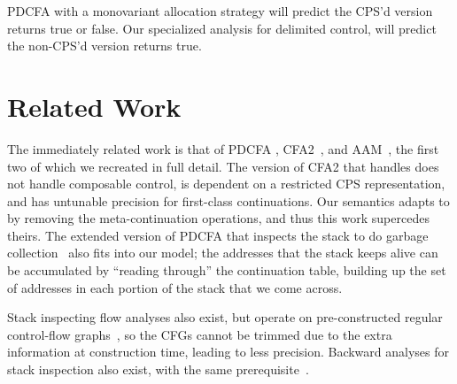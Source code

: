 {\begin{SCodeFlow}
\begin{RktBlk}
\begin{SingleColumn}
\mbox{}\RktPn{(}\mbox{}\mbox{}\RktPn{(}\RktSym{$\lambda$}\mbox{}\RktPn{(}\RktPn{)}\mbox{}\RktPn{(}\mbox{}\mbox{}\RktPn{(}\RktSym{$\lambda$}\mbox{}\RktPn{(}\RktPn{)}\mbox{}\RktPn{(}\RktSym{$\le$}\mbox{}\mbox{}\RktPn{)}\RktPn{)}\RktPn{)}\RktPn{)}\RktPn{)}\RktPn{)}\end{SingleColumn}\end{RktBlk}\end{SCodeFlow}

PDCFA with a monovariant allocation strategy will predict the CPS'd version returns true or false.
%
Our specialized analysis for delimited control, will predict the non-CPS'd version returns true.}

\section{Related Work}

The immediately related work is that of PDCFA \citep{dvanhorn:Earl2010Pushdown, dvanhorn:Earl2012Introspective}, CFA2~\citep{ianjohnson:vardoulakis-lmcs11, ianjohnson:Vardoulakis2011Pushdown}, and AAM~\citep{dvanhorn:VanHorn2010Abstracting}, the first two of which we recreated in full detail.
%
The version of CFA2 that handles  does not handle composable control, is dependent on a restricted CPS representation, and has untunable precision for first-class continuations.
%
Our semantics adapts to  by removing the meta-continuation operations, and thus this work supercedes theirs.
%
The extended version of PDCFA that inspects the stack to do garbage collection~\citep{dvanhorn:Earl2012Introspective} also fits into our model;
the addresses that the stack keeps alive can be accumulated by ``reading through'' the continuation table, building up the set of addresses in each portion of the stack that we come across.

Stack inspecting flow analyses also exist, but operate on pre-constructed regular control-flow graphs~\citep{ianjohnson:bartoletti2004stack}, so the CFGs cannot be trimmed due to the extra information at construction time, leading to less precision.
%
Backward analyses for stack inspection also exist, with the same prerequisite~\citep{ianjohnson:DBLP:journals/sigplan/Chang06}.


